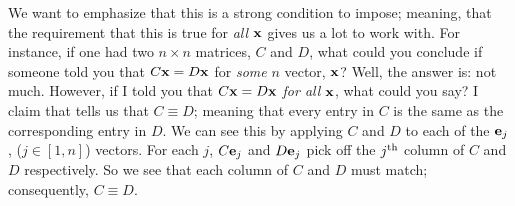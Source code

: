 \documentclass{article}
\begin{document}
We want to emphasize that this is a strong condition to impose; meaning, that the 
requirement that this is true for {\em all\/} ${\bf x}$ gives us a lot to work with.
For instance, if one had two $n\times n$ matrices, $C$ and $D$, what could you conclude if someone
told you that $C {\bf x} = D {\bf x}$ for {\em some\/} $n$ vector, ${\bf x}$?
Well, the answer is: not much.
However, if I told you that $C {\bf x} = D {\bf x}$ {\em for all\/} ${\bf x}$, what could you say?
I claim that tells us that $C \equiv D$; meaning that every entry in $C$ is the same as the corresponding
entry in $D$. We can see this by applying $C$ and $D$ to each of the ${\bf e}_j$, ($j \in [1, n]$) vectors.
For each $j$, $C {\bf e}_j$ and $D {\bf e}_j$ pick off the $j^{\rm th}$ column of 
$C$ and $D$ respectively. So we see that each column of $C$ and $D$ must match; consequently,
$C \equiv D$.
\end{document}
